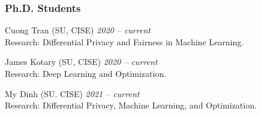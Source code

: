 
\subsubsection*{Ph.D. Students}
\beginList
	\item {Cuong Tran} (SU, CISE) \hfill{\em 2020 -- current}\\
	Research: Differential Privacy and Fairness in Machine Learning.

	\item {James Kotary} (SU, CISE) \hfill{\em 2020 -- current}\\
	Research: Deep Learning and Optimization.
	
	\item {My Dinh} (SU. CISE) \hfill{\em 2021 -- current}\\
	Research: Differential Privacy, Machine Learning, and Optimization.





\endList


